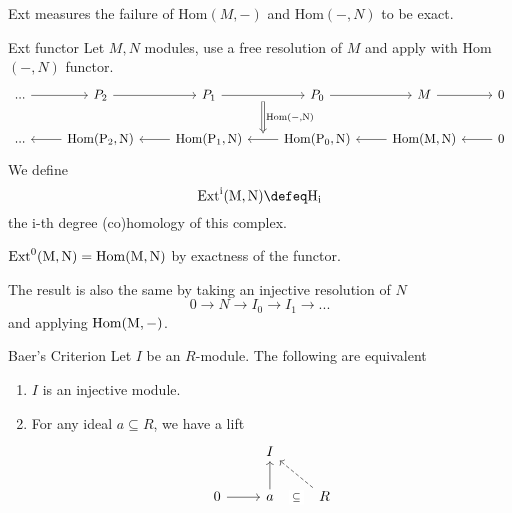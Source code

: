 Ext measures the failure of Hom$(M,-)$ and Hom$(-,N)$ to be exact.
\begin{adefinition}{Ext functor}{}
    Let $M,N$ modules, use a free resolution of $M$ and apply with Hom$(-,N)$ functor.
\[\begin{tikzcd}
	{...} & {P_2} & {P_1} & {P_0} & M & 0 \\
	{...} & {\rm{Hom}(P_2,N)} & {\rm{Hom}(P_1,N)} & {\rm{Hom}(P_0,N)} & {\rm{Hom}(M,N)} & 0
	\arrow[from=1-1, to=1-2]
	\arrow[from=1-2, to=1-3]
	\arrow[""{name=0, anchor=center, inner sep=0}, from=1-3, to=1-4]
	\arrow[from=1-4, to=1-5]
	\arrow[from=1-5, to=1-6]
	\arrow[from=2-2, to=2-1]
	\arrow[from=2-3, to=2-2]
	\arrow[""{name=1, anchor=center, inner sep=0}, from=2-4, to=2-3]
	\arrow[from=2-5, to=2-4]
	\arrow[from=2-6, to=2-5]
	\arrow["{\rm{Hom}(-,N)}", shorten <=4pt, shorten >=4pt, Rightarrow, from=0, to=1]
\end{tikzcd}\]
We define \[
\rm{Ext}^i(M,N)\defeq H_i
\]
the i-th degree (co)homology of this complex. 
\end{adefinition}
\begin{remark}
    $\rm{Ext}^0(M,N)=\rm{Hom}(M,N)$ by exactness of the functor.

    The result is also the same by taking an injective resolution of $N$  \[
    0\to N \to I_0\to I_1 \to...
    \]
     and applying $\rm{Hom}(M,-)$.
\end{remark}

\begin{atheorem}{Baer's Criterion}{}
    Let $I$ be an $R$-module.
    The following are equivalent \begin{enumerate}
        \item $I$ is an injective module.
        \item For any ideal $a\subseteq R$, we have a lift %
\[\begin{tikzcd}
	& I \\
	0 & a & R
	\arrow[from=2-1, to=2-2]
	\arrow[from=2-2, to=1-2]
	\arrow["\subseteq"{description}, draw=none, from=2-2, to=2-3]
	\arrow[dashed, from=2-3, to=1-2]
\end{tikzcd}\]
    \end{enumerate}
\end{atheorem}

